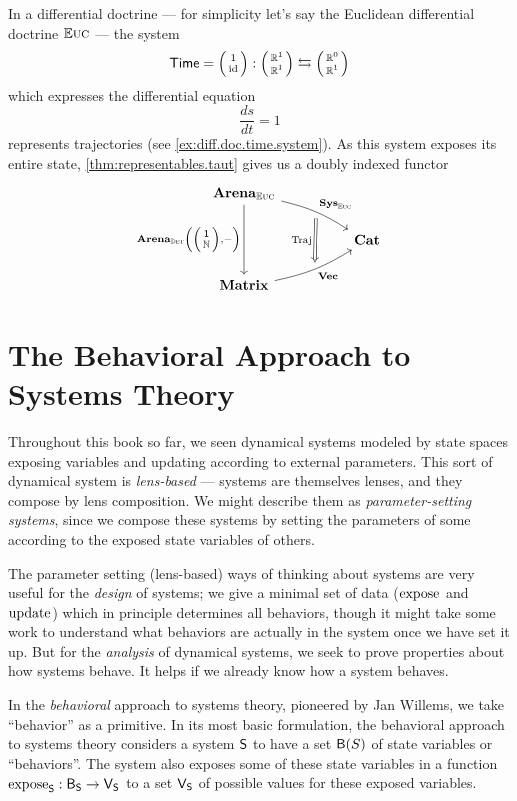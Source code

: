 \documentclass[DynamicalBook]{subfiles}
\begin{document}
\begin{example}\label{ex:trajectories.compositional.behavior}
In a differential doctrine --- for simplicity let's say the Euclidean
differential doctrine $\mathbb{E}\textsc{uc}$ --- the system
\[
\Sys{Time} = \lens{1}{\id} : \lens{\rr^1}{\rr^1} \fromto \lens{\rr^0}{\rr^1}
\]
which expresses the differential equation
$$\frac{ds}{dt} = 1$$
represents trajectories (see \cref{ex:diff.doc.time.system}). As this system
exposes its entire state, \cref{thm:representables.taut} gives us a doubly
indexed functor
\[
\begin{tikzcd}
	{\Cat{Arena}_{\eucdiff}} \\
	&& {\Cat{Cat}} \\
	{\Cat{Matrix}}
	\arrow[""{name=0, anchor=center, inner sep=0}, "{\Cat{Sys}_{\eucdiff}}", from=1-1,
  to=2-3, bend left = 10]
	\arrow[""{name=1, anchor=center, inner sep=0}, "{\Cat{Vec}}"', from=3-1,
  to=2-3, bend right = 10]
	\arrow["{\Cat{Arena}_{\determ}\left(\littlelens{\ord{1}}{\nn},-\right)}"', from=1-1, to=3-1]
	\arrow["{\Fun{Traj}}"', shorten <=4pt, shorten >=4pt, Rightarrow, from=0, to=1]
\end{tikzcd}
\]

\end{example}

\section{The Behavioral Approach to Systems Theory}

Throughout this book so far, we seen dynamical systems modeled by state spaces exposing
variables and updating according to external parameters. This sort of dynamical
system is \emph{lens-based} --- systems are themselves lenses, and they compose by
lens composition. We might describe them as \emph{parameter-setting systems},
since we compose these systems by setting the parameters of some according to
the exposed state variables of others.


The parameter setting (lens-based) ways of thinking about systems are very useful for the \emph{design} of systems; we give
a minimal set of data ($\mathrm{expose}_{\mathsf{}}$ and $\mathrm{update}_{\mathsf{}}$) which in principle determines all behaviors, though it
might take some work to understand what behaviors are actually in the system
once we have set it up. But for the \emph{analysis} of dynamical systems, we
seek to prove properties about how systems behave. It helps if we
already know how a system behaves.

In the \emph{behavioral} approach to systems theory, pioneered by Jan Willems,
we take ``behavior'' as a primitive. In its most basic formulation, the behavioral
approach to systems theory considers a system $\mathsf{S}$ to have a set
$\mathsf{B}(S)$ of state variables or ``behaviors''. The system also exposes some of these
state variables in a function $\mathrm{expose}_{\mathsf{S}} : \mathsf{B}_{\mathsf{S}} \to \mathsf{V}_{\mathsf{S}}$
to a set
$\mathsf{V}_{\mathsf{S}}$ of possible values for these exposed variables.
\end{document}
